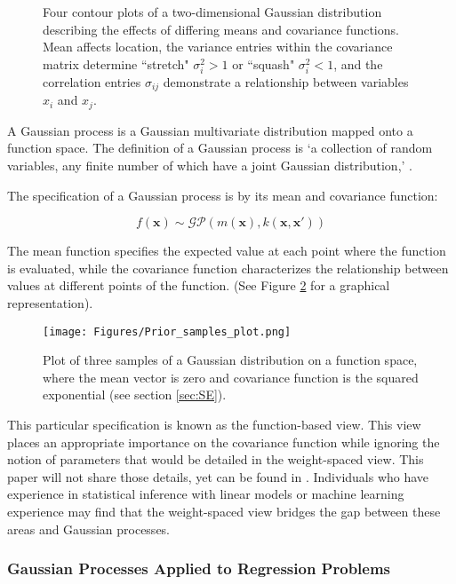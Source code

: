 \documentclass[12pt,a4paper]{article}
\begin{document}
\begin{figure}[h]
    \caption{Four contour plots of a two-dimensional Gaussian distribution describing the effects of differing means and covariance functions. Mean affects location, the variance entries within the covariance matrix determine ``stretch" \(\sigma_i^2 > 1\) or ``squash" \(\sigma_i^2 < 1\), and the correlation entries \(\sigma_{ij}\) demonstrate a relationship between variables \(x_i\) and \(x_j\).}
    \label{fig:contour plots}
\end{figure}

A Gaussian process is a Gaussian multivariate distribution mapped onto a function space. The definition of a Gaussian process is `a collection of random variables, any finite number of which have a joint Gaussian distribution,' \citep[pp.~13]{williams2006gaussian}.

The specification of a Gaussian process is by its mean and covariance function:

\begin{equation*}
    f(\mathbf{x}) \sim \mathcal{GP}(m(\mathbf{x}),k(\mathbf{x},\mathbf{x'}))
\end{equation*}

The mean function specifies the expected value at each point where the function is evaluated, while the covariance function characterizes the relationship between values at different points of the function. (See Figure \ref{fig:Prior_samples_plot} for a graphical representation).

\begin{figure}[h]
\centering
\texttt{[image: Figures/Prior\_samples\_plot.png]} 
\caption{Plot of three samples of a Gaussian distribution on a function space, where the mean vector is zero and covariance function is the squared exponential (see section \ref{sec:SE}).} \label{fig:Prior_samples_plot}
\end{figure}

This particular specification is known as the function-based view. This view places an appropriate importance on the covariance function while ignoring the notion of parameters that would be detailed in the weight-spaced view. This paper will not share those details, yet can be found in \citet{williams2006gaussian}. Individuals who have experience in statistical inference with linear models or machine learning experience may find that the weight-spaced view bridges the gap between these areas and Gaussian processes.

\subsubsection{Gaussian Processes Applied to Regression Problems}
\label{sec:Gaussian Processes applied to Regression problems}
\end{document}
